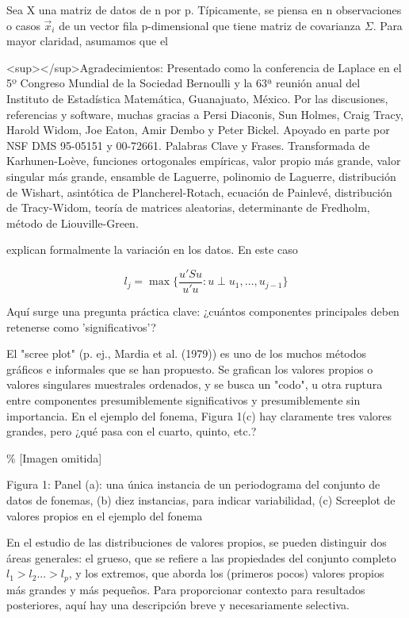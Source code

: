 \documentclass[11pt,a4paper]{article}
\begin{document}
Sea X una matriz de datos de n por p. Típicamente, se piensa en n observaciones o casos $\vec{x}_i$ de un vector fila p-dimensional que tiene matriz de covarianza $\Sigma$. Para mayor claridad, asumamos que el

<sup>\*</sup>Agradecimientos: Presentado como la conferencia de Laplace en el 5º Congreso Mundial de la Sociedad Bernoulli y la 63ª reunión anual del Instituto de Estadística Matemática, Guanajuato, México. Por las discusiones, referencias y software, muchas gracias a Persi Diaconis, Sun Holmes, Craig Tracy, Harold Widom, Joe Eaton, Amir Dembo y Peter Bickel. Apoyado en parte por NSF DMS 95-05151 y 00-72661. Palabras Clave y Frases. Transformada de Karhunen-Loève, funciones ortogonales empíricas, valor propio más grande, valor singular más grande, ensamble de Laguerre, polinomio de Laguerre, distribución de Wishart, asintótica de Plancherel-Rotach, ecuación de Painlevé, distribución de Tracy-Widom, teoría de matrices aleatorias, determinante de Fredholm, método de Liouville-Green.

explican formalmente la variación en los datos. En este caso

$$l_j = \max\{\frac{u'Su}{u'u} : u \perp u_1, \dots, u_{j-1}\}$$

Aquí surge una pregunta práctica clave: ¿cuántos componentes principales deben retenerse como 'significativos'?

El "scree plot" (p. ej., Mardia et al. (1979)) es uno de los muchos métodos gráficos e informales que se han propuesto. Se grafican los valores propios o valores singulares muestrales ordenados, y se busca un "codo", u otra ruptura entre componentes presumiblemente significativos y presumiblemente sin importancia. En el ejemplo del fonema, Figura 1(c) hay claramente tres valores grandes, pero ¿qué pasa con el cuarto, quinto, etc.?

\% [Imagen omitida]

Figura 1: Panel (a): una única instancia de un periodograma del conjunto de datos de fonemas, (b) diez instancias, para indicar variabilidad, (c) Screeplot de valores propios en el ejemplo del fonema

En el estudio de las distribuciones de valores propios, se pueden distinguir dos áreas generales: el grueso, que se refiere a las propiedades del conjunto completo $l_1 > l_2 ... > l_p$, y los extremos, que aborda los (primeros pocos) valores propios más grandes y más pequeños. Para proporcionar contexto para resultados posteriores, aquí hay una descripción breve y necesariamente selectiva.
\end{document}

